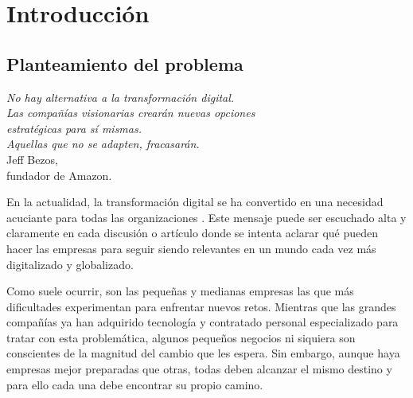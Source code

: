 \chapter {Introducción}
\label{sec:intro}

\section {Planteamiento del problema}

\begin{flushright}
\begin{minipage}[b][4cm][t]{11cm}
\begin{flushright}
{\small \emph{No hay alternativa a la transformación digital.}} \vspace{-1pt} \\
{\small \emph{Las compañías visionarias crearán nuevas opciones}} \vspace{-1pt} \\
{\small \emph{estratégicas para sí mismas.}} \vspace{-1pt} \\
{\small \emph{Aquellas que no se adapten, fracasarán.}} \vspace{1mm}\\
{\footnotesize Jeff Bezos,} \vspace{-1.5pt} \\
{\footnotesize fundador de Amazon.\phantom{l}}
\end{flushright}
\end{minipage}
\end{flushright}

En la actualidad,  la transformación digital se ha convertido en una necesidad acuciante para todas las organizaciones \cite{DigitalBT}. Este mensaje puede ser escuchado alta y claramente en cada discusión o artículo donde se intenta aclarar qué pueden hacer las empresas para seguir siendo relevantes en un mundo cada vez más digitalizado y globalizado. 

Como suele ocurrir, son las pequeñas y medianas empresas las que más dificultades experimentan para enfrentar nuevos retos. Mientras que las grandes compañías ya han adquirido tecnología y contratado personal especializado para tratar con esta problemática, algunos pequeños negocios ni siquiera son conscientes de la magnitud del cambio que les espera. Sin embargo, aunque haya empresas mejor preparadas que otras, todas deben alcanzar el mismo destino y para ello cada una debe encontrar su propio camino.

